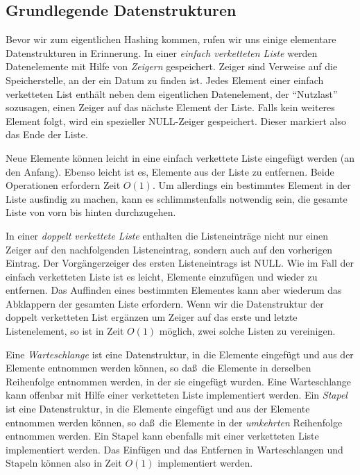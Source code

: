 \documentclass[10pt,reqno]{amsart}
\numberwithin{equation}{section}
\begin{document}
\subsection{Grundlegende Datenstrukturen}\label{sec_lists}
Bevor wir zum eigentlichen Hashing kommen, rufen wir uns einige elementare Datenstrukturen in Erinnerung.
In einer {\em einfach verketteten Liste} werden Datenelemente mit Hilfe von {\em Zeigern} gespeichert.
Zeiger sind Verweise auf die Speicherstelle, an der ein Datum zu finden ist.
Jedes Element einer einfach verketteten List enth\"alt neben dem eigentlichen Datenelement, der ``Nutzlast'' sozusagen, einen Zeiger auf das n\"achste Element der Liste.
Falls kein weiteres Element folgt, wird ein spezieller NULL-Zeiger gespeichert.
Dieser markiert also das Ende der Liste.

Neue Elemente k\"onnen leicht in eine einfach verkettete Liste eingef\"ugt werden (an den Anfang).
Ebenso leicht ist es, Elemente aus der Liste zu entfernen.
Beide Operationen erfordern Zeit $O(1)$.
Um allerdings ein bestimmtes Element in der Liste ausfindig zu machen, kann es schlimmstenfalls notwendig sein, die gesamte Liste von vorn bis hinten durchzugehen.

In einer {\em doppelt verkettete Liste} enthalten die Listeneintr\"age nicht nur einen Zeiger auf den nachfolgenden Listeneintrag, sondern auch auf den vorherigen Eintrag.
Der Vorg\"angerzeiger des ersten Listeneintrags ist NULL.
Wie im Fall der einfach verketteten Liste ist es leicht, Elemente einzuf\"ugen und wieder zu entfernen.
Das Auffinden eines bestimmten Elementes kann aber wiederum das Abklappern der gesamten Liste erfordern.
Wenn wir die Datenstruktur der doppelt verketteten List erg\"anzen um Zeiger auf das erste und letzte Listenelement, so ist in Zeit $O(1)$ m\"oglich, zwei solche Listen zu vereinigen.

Eine {\em Warteschlange} ist eine Datenstruktur, in die Elemente eingef\"ugt und aus der Elemente entnommen werden k\"onnen, so da\ss\ die Elemente in derselben Reihenfolge entnommen werden, in der sie eingef\"ugt wurden.
Eine Warteschlange kann offenbar mit Hilfe einer verketteten Liste implementiert werden.
Ein {\em Stapel} ist eine Datenstruktur, in die Elemente eingef\"ugt und aus der Elemente entnommen werden k\"onnen, so da\ss\ die Elemente in der {\em umkehrten} Reihenfolge entnommen werden.
Ein Stapel kann ebenfalls mit einer verketteten Liste implementiert werden.
Das Einf\"ugen und das Entfernen in Warteschlangen und Stapeln k\"onnen also in Zeit $O(1)$ implementiert werden.
\end{document}
